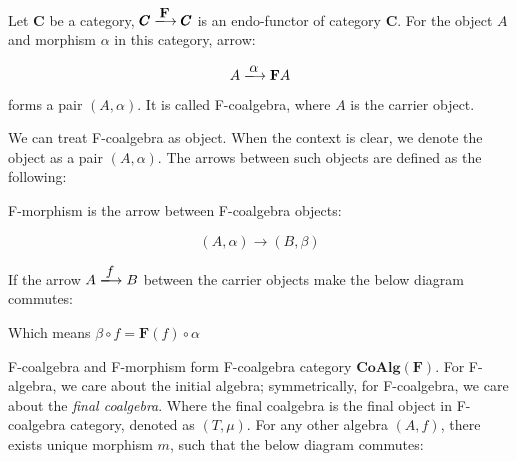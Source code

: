 \documentclass{article}
\begin{document}
\begin{definition}
\normalfont
Let $\pmb{C}$ be a category, $\pmb{C} \arrowto{\mathbf{F}} \pmb{C}$ is an endo-functor of category $\pmb{C}$. For the object $A$ and morphism $\alpha$ in this category, arrow:

\[
  A \arrowto{\alpha} \mathbf{F} A
\]

forms a pair $(A, \alpha)$. It is called F-coalgebra, where $A$ is the carrier object.
\end{definition}

We can treat F-coalgebra as object. When the context is clear, we denote the object as a pair $(A, \alpha)$. The arrows between such objects are defined as the following:

\begin{definition}
\normalfont
F-morphism is the arrow between F-coalgebra objects:

\[
  (A, \alpha) \longrightarrow (B, \beta)
\]

If the arrow $A \arrowto{f} B$ between the carrier objects make the below diagram commutes:

\begin{center}
\end{center}

Which means $\beta \circ f = \mathbf{F}(f) \circ \alpha$
\end{definition}

F-coalgebra and F-morphism form F-coalgebra category $\pmb{CoAlg}(\mathbf{F})$. For F-algebra, we care about the initial algebra; symmetrically, for F-coalgebra, we care about the {\em final coalgebra}. Where the final coalgebra is the final object in F-coalgebra category, denoted as $(T, \mu)$. For any other algebra $(A, f)$, there exists unique morphism $m$, such that the below diagram commutes:

\begin{center}
\end{center}
\end{document}
